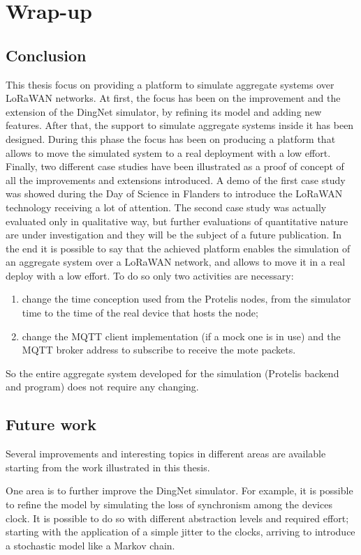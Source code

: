 \chapter{Wrap-up}
\label{chap:conclusions}
\section{Conclusion} 
This thesis focus on providing a platform to simulate aggregate systems over \mbox{LoRaWAN} networks.
At first, the focus has been on the improvement and the extension of the DingNet simulator, by refining its model and adding new features.
After that, the support to simulate aggregate systems inside it has been designed. 
During this phase the focus has been on producing a platform that allows to move the simulated system to a real deployment with a low effort.
Finally, two different case studies have been illustrated as a proof of concept of all the improvements and extensions introduced.
A demo of the first case study was showed during the Day of Science in Flanders to introduce the LoRaWAN technology receiving a lot of attention.
The second case study was actually evaluated only in qualitative way, but further evaluations of quantitative nature are under investigation and they will be the subject of a future publication.
In the end it is possible to say that the achieved platform enables the simulation of an aggregate system over a LoRaWAN network, and allows to move it in a real deploy with a low effort. 
To do so only two activities are necessary:
\begin{enumerate}
    \item change the time conception used from the Protelis nodes, from the simulator time to the time of the real device that hosts the node;
    \item change the MQTT client implementation (if a mock one is in use) and the MQTT broker address to subscribe to receive the mote packets.
\end{enumerate}
 So the entire aggregate system developed for the simulation (Protelis backend and program) does not require any changing.

\section{Future work}
Several improvements and interesting topics in different areas are available starting from the work illustrated in this thesis.

One area is to further improve the DingNet simulator. 
For example, it is possible to refine the model by simulating the loss of synchronism among the devices clock. 
It is possible to do so with different abstraction levels and required effort; starting with the application of a simple jitter to the clocks, arriving to introduce a stochastic model like a Markov chain.

